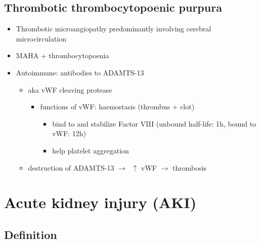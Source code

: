 \documentclass[
  12pt,
]{memoir}
\providecommand{\tightlist}{%
  \setlength{\itemsep}{0pt}\setlength{\parskip}{0pt}}
\begin{document}
\hypertarget{thrombotic-thrombocytopoenic-purpura}{%
\subsection{Thrombotic thrombocytopoenic
purpura}\label{thrombotic-thrombocytopoenic-purpura}}

\begin{itemize}
\tightlist
\item
  Thrombotic microangiopathy predominantly involving cerebral
  microcirculation
\item
  MAHA + thrombocytopoenia
\item
  Autoimmune: antibodies to ADAMTS-13

  \begin{itemize}
  \tightlist
  \item
    aka vWF cleaving protease

    \begin{itemize}
    \tightlist
    \item
      functions of vWF: haemostasis (thrombus + clot)

      \begin{itemize}
      \tightlist
      \item
        bind to and stabilize Factor VIII (unbound half-life: 1h, bound
        to vWF: 12h)
      \item
        help platelet aggregation
      \end{itemize}
    \end{itemize}
  \item
    destruction of ADAMTS-13 \(\rightarrow\;\;\uparrow\) vWF
    \(\rightarrow\) thrombosis
  \end{itemize}
\end{itemize}

\hypertarget{acute-kidney-injury-aki}{%
\section{Acute kidney injury (AKI)}\label{acute-kidney-injury-aki}}

\hypertarget{definition}{%
\subsection{Definition}\label{definition}}
\end{document}
